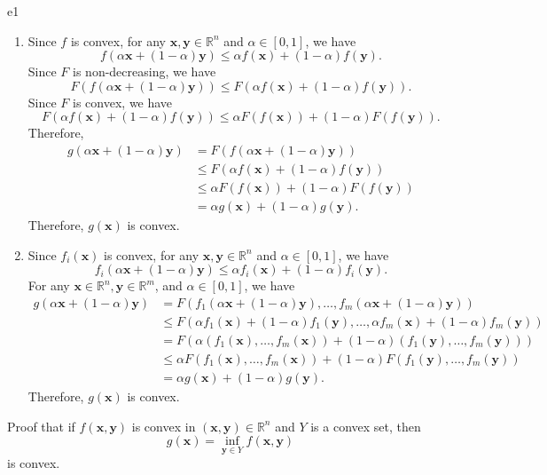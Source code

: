 \documentclass{article}
\newcommand{\xB}{\bm{x}}
\newcommand{\yB}{\bm{y}}
\newcommand{\RBB}{\mathbb{R}}
\begin{document}
\begin{PROOF}{e1}
\begin{enumerate}
	\item Since $f$ is convex, for any $\xB, \yB \in \RBB^n$ and $\alpha \in [0, 1]$, we have
	\[
	f(\alpha \xB + (1 - \alpha) \yB) \leq \alpha f(\xB) + (1 - \alpha) f(\yB).
	\]
	Since $F$ is non-decreasing, we have
	\[
	F(f(\alpha \xB + (1 - \alpha) \yB)) \leq F(\alpha f(\xB) + (1 - \alpha) f(\yB)).
	\]
	Since $F$ is convex, we have
	\[
	F(\alpha f(\xB) + (1 - \alpha) f(\yB)) \leq \alpha F(f(\xB)) + (1 - \alpha) F(f(\yB)).
	\]
	Therefore, 
	\[
	\begin{aligned}
	g(\alpha \xB + (1 - \alpha) \yB) &= F(f(\alpha \xB + (1 - \alpha) \yB)) \\
	&\leq F(\alpha f(\xB) + (1 - \alpha) f(\yB)) \\
	&\leq \alpha F(f(\xB)) + (1 - \alpha) F(f(\yB)) \\
	&= \alpha g(\xB) + (1 - \alpha) g(\yB).
	\end{aligned}
	\]
	Therefore, $g(\xB)$ is convex.
	\item Since $f_i(\xB)$ is convex, for any $\xB, \yB \in \RBB^n$ and $\alpha \in [0, 1]$, we have
	\[
	f_i(\alpha \xB + (1 - \alpha) \yB) \leq \alpha f_i(\xB) + (1 - \alpha) f_i(\yB).
	\]
	For any $\xB \in \RBB^n, \yB \in \RBB^m$, and $\alpha \in [0, 1]$, we have
	\[
	\begin{aligned}
	g(\alpha \xB + (1 - \alpha) \yB) &= F(f_1(\alpha \xB + (1 - \alpha) \yB), \ldots, f_m(\alpha \xB + (1 - \alpha) \yB)) \\
	&\leq F(\alpha f_1(\xB) + (1 - \alpha) f_1(\yB), \ldots, \alpha f_m(\xB) + (1 - \alpha) f_m(\yB)) \\
	&= F(\alpha (f_1(\xB), \ldots, f_m(\xB)) + (1 - \alpha) (f_1(\yB), \ldots, f_m(\yB))) \\
	&\leq \alpha F(f_1(\xB), \ldots, f_m(\xB)) + (1 - \alpha) F(f_1(\yB), \ldots, f_m(\yB)) \\
	&= \alpha g(\xB) + (1 - \alpha) g(\yB).
	\end{aligned}
	\]
	Therefore, $g(\xB)$ is convex.
\end{enumerate}
\end{PROOF}
\newpage
\begin{excercise}\label{e2}
Proof that if $f(\xB, \yB)$ is convex in $(\xB, \yB) \in \RBB^n$ and  $Y$ is a convex set, then 
\[
g(\xB) = \inf_{\yB \in Y}f(\xB, \yB)
\]
is convex.
\end{excercise}
\end{document}

